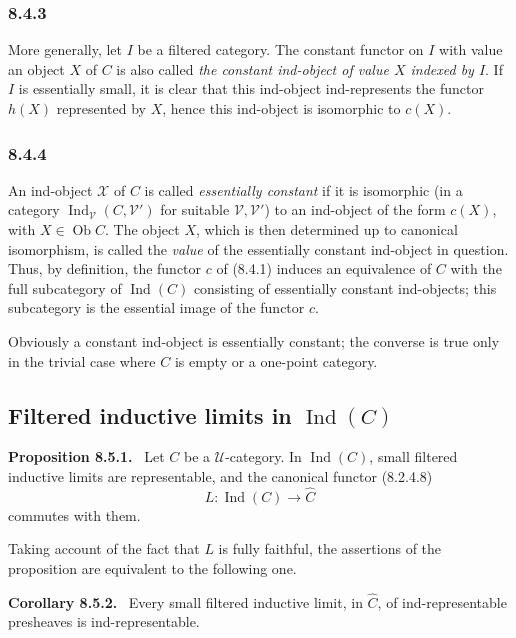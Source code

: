 \documentclass[11pt]{article}
\newcommand{\U}{\mathcal{U}}
\newcommand{\V}{\mathcal{V}}
\newcommand{\Ob}{\operatorname{Ob}}
\newcommand{\Ind}{\operatorname{Ind}}
\newenvironment{statement}[1]{\par\medskip\noindent\textbf{#1.}\ }{\par\medskip}
\begin{document}
\subsubsection*{8.4.3}
More generally, let $I$ be a filtered category. The constant functor on $I$ with value an object $X$ of $C$ is also called \emph{the constant ind-object of value $X$ indexed by $I$}. If $I$ is essentially small, it is clear that this ind-object ind-represents the functor $h(X)$ represented by $X$, hence this ind-object is isomorphic to $c(X)$.

\subsubsection*{8.4.4}
An ind-object $\mathcal X$ of $C$ is called \emph{essentially constant} if it is isomorphic (in a category $\Ind_{\V}(C,\V')$ for suitable $\V,\V'$) to an ind-object of the form $c(X)$, with $X\in\Ob C$. The object $X$, which is then determined up to canonical isomorphism, is called the \emph{value} of the essentially constant ind-object in question. Thus, by definition, the functor $c$ of (8.4.1) induces an equivalence of $C$ with the full subcategory of $\Ind(C)$ consisting of essentially constant ind-objects; this subcategory is the essential image of the functor $c$.

Obviously a constant ind-object is essentially constant; the converse is true only in the trivial case where $C$ is empty or a one-point category.

\subsection{Filtered inductive limits in $\Ind(C)$}

\begin{statement}{Proposition 8.5.1}
Let $C$ be a $\U$-category. In $\Ind(C)$, small filtered inductive limits are representable, and the canonical functor (8.2.4.8)
\[
L:\Ind(C)\longrightarrow\widehat C
\]
commutes with them.
\end{statement}

Taking account of the fact that $L$ is fully faithful, the assertions of the proposition are equivalent to the following one.

\begin{statement}{Corollary 8.5.2}
Every small filtered inductive limit, in $\widehat C$, of ind-representable presheaves is ind-representable.
\end{statement}
\end{document}
